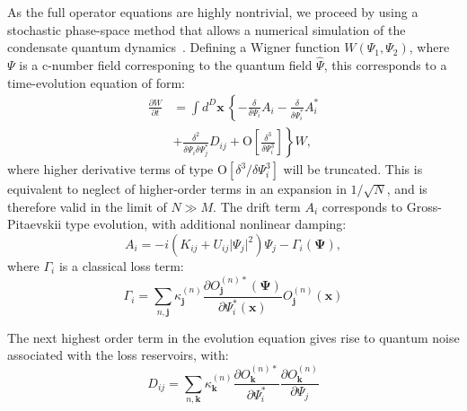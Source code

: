 \documentclass[aps,prl,twocolumn,showpacs,amsmath,amssymb,superscriptaddress]{revtex4-1}
\newcommand{\petersremark}[1]{\textcolor{cyan}{{[}PD: #1{]}}}
\newcommand{\xvec}{\boldsymbol{x}}
\newcommand{\jvec}{\boldsymbol{j}}
\newcommand{\kvec}{\boldsymbol{k}}
\newcommand{\Psivec}{\boldsymbol{\Psi}}
\begin{document}
As the full operator equations are highly nontrivial,
we proceed by using a stochastic phase-space method
that allows a numerical simulation of the condensate quantum dynamics~\cite{Drummond1993,Steel1998,Hoffmann2008}.
Defining a Wigner function $W\left(\Psi_{1},\Psi_{2}\right)$,
where $\Psi$ is a c-number field corresponing to the quantum field $\hat{\Psi}$,
this corresponds to a time-evolution equation of form:
\begin{equation}
\begin{split}
	\frac{\partial W}{\partial t} & = \int d^D \xvec \,\left\{
		-\frac{\delta}{\delta\Psi_{i}} A_{i} -
		\frac{\delta}{\delta\Psi_{i}^*} A_{i}^* \right. \\
& + \left. \frac{\delta^{2}}{\delta\Psi_{i} \delta\Psi_{j}^{*}}D_{ij} +
		\mbox{O} \left[ \frac{\delta^{3}}{\delta\Psi_{i}^{3}} \right]
	\right\} W,
\end{split}
\end{equation}
where higher derivative terms of type $\mbox{O}\left[\delta^3/\delta\Psi_{i}^{3}\right]$
will be truncated.
This is equivalent to neglect of higher-order terms in an expansion in $1/\sqrt{N}$,
and is therefore valid in the limit of $N \gg M$.
The drift term $A_{i}$ corresponds to Gross-Pitaevskii type evolution,
with additional nonlinear damping:
\begin{equation}
	A_{i} = -i \left( K_{ij} + U_{ij} \lvert \Psi_{j} \rvert^{2} \right) \Psi_{j} -
	\Gamma_{i} \left( \Psivec \right),
\end{equation}
where $\Gamma_{i}$ is a classical loss term:
\begin{equation}
	\Gamma_{i} = \sum_{n,\jvec} \kappa_{\jvec}^{(n)}
	\frac{
		\partial O_{\jvec}^{(n)*} \left( \Psivec \right)
	}{
		\partial \Psi_{i}^* \left( \xvec \right)
	}
	O_{\jvec}^{(n)} \left( \xvec \right)
\end{equation}

The next highest order term in the evolution equation gives rise to
quantum noise associated with the loss reservoirs,
with:
\begin{equation}
	D_{ij} = \sum_{n,\kvec} \kappa_{\kvec}^{(n)}
	\frac{\partial O_{\kvec}^{(n)*}}{\partial\Psi_{i}^{*}}
	\frac{\partial O_{\kvec}^{(n)}}{\partial\Psi_{j}}
\end{equation}
\end{document}
